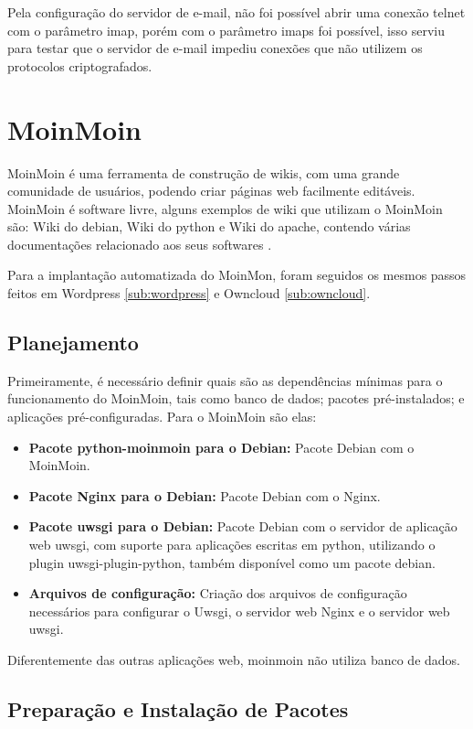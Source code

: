Pela configuração do servidor de e-mail, não foi possível abrir uma conexão telnet
com o parâmetro imap, porém com o parâmetro imaps foi possível, isso serviu para testar 
que o servidor de e-mail impediu conexões que não 
utilizem os protocolos criptografados.

\section{MoinMoin}
\label{sub:moinmoin}

MoinMoin é uma ferramenta de construção
de wikis, com uma grande comunidade de usuários, podendo criar páginas web
facilmente editáveis. MoinMoin é software livre, alguns exemplos
de wiki que utilizam o MoinMoin são: Wiki do debian, Wiki do python e Wiki do apache,
contendo várias documentações relacionado aos seus softwares \cite{moin}. 

Para a implantação automatizada do MoinMon, foram seguidos os mesmos passos
feitos em Wordpress \ref{sub:wordpress} e Owncloud \ref{sub:owncloud}.

\subsection{Planejamento}

Primeiramente, é necessário definir quais são as dependências
mínimas para o funcionamento do MoinMoin, tais como banco de dados; pacotes
pré-instalados; e aplicações pré-configuradas. Para o MoinMoin são elas:

\begin{itemize}
   \item \textbf{Pacote python-moinmoin para o Debian:} Pacote Debian com o MoinMoin.
   \item \textbf{Pacote Nginx para o Debian:} Pacote Debian com o Nginx.
   \item \textbf{Pacote uwsgi para o Debian:} Pacote Debian com o servidor de aplicação web
uwsgi, com suporte para aplicações escritas em python, utilizando o plugin uwsgi-plugin-python,
também disponível como um pacote debian.
   \item \textbf{Arquivos de configuração:} Criação dos arquivos de configuração
   necessários para configurar o Uwsgi, o servidor web Nginx e o servidor web
uwsgi.
\end{itemize}

Diferentemente das outras aplicações web, moinmoin não utiliza banco de dados.

\subsection{Preparação e Instalação de Pacotes}

